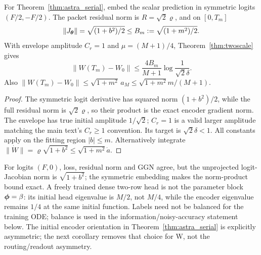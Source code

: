 \begin{corollary}
\label{cor:astra_serial_bound}
For Theorem~\ref{thm:astra_serial}, embed the scalar prediction in
symmetric logits $(F/2,-F/2)$. The packet residual norm is
$R=\sqrt2\varrho$, and on $[0,T_m]$
\[
 \|J_{\boldsymbol{\theta}}\|=\sqrt{(1+b^2)/2}\le B_m:=\sqrt{(1+m^2)/2}.
\]
With envelope amplitude $C_r=1$ and $\mu=(M+1)/4$,
Theorem~\ref{thm:twoscale} gives
\begin{equation}\label{eq:astra_serial_bound}
 \|W(T_m)-W_0\|\le\frac{4B_m}{M+1}\log\frac1{\sqrt2\delta}.
\end{equation}
Also $\|W(T_m)-W_0\|\le\sqrt{1+m^2}\,a_M
\le\sqrt{1+m^2}m/(M+1)$.
\end{corollary}
\begin{proof}
The symmetric logit derivative has squared norm $(1+b^2)/2$, while
the full residual norm is $\sqrt2\varrho$, so their product is the
exact encoder gradient norm. The envelope has true initial amplitude
$1/\sqrt2$; $C_r=1$ is a valid larger amplitude matching the main
text's $C_r\ge1$ convention. Its target is $\sqrt2\delta<1$.
All constants apply on the fitting region $|b|\le m$.
Alternatively integrate $\|\dot W\|=\varrho\sqrt{1+b^2}
\le\sqrt{1+m^2}\dot a$.
\end{proof}
\begin{remark}
For logits $(F,0)$, loss, residual norm and GGN agree, but the unprojected
logit-Jacobian norm is $\sqrt{1+b^2}$; the symmetric embedding makes
the norm-product bound exact. A freely trained dense two-row head is
not the parameter block ${\boldsymbol{\phi}}=\beta$: its initial head eigenvalue is
$M/2$, not $M/4$, while the encoder eigenvalue remains $1/4$ at the
same initial function. Labels need not be balanced for the training
ODE; balance is used in the information/noisy-accuracy statement below.
The initial encoder orientation in Theorem~\ref{thm:astra_serial} is
explicitly asymmetric; the next corollary removes that choice for W,
not the routing/readout asymmetry.
\end{remark}

